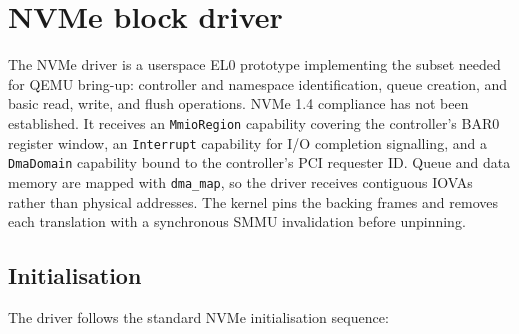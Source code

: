 \begin{center}
\end{center}

\section{NVMe block driver}

The NVMe driver is a userspace EL0 prototype implementing the subset needed for
QEMU bring-up: controller and namespace identification, queue creation, and
basic read, write, and flush operations. NVMe 1.4 compliance has not been
established. It receives an \texttt{MmioRegion} capability covering the controller's
BAR0 register window, an \texttt{Interrupt} capability for I/O
completion signalling, and a \texttt{DmaDomain} capability bound to the
controller's PCI requester ID. Queue and data memory are mapped with
\texttt{dma\_map}, so the driver receives contiguous IOVAs rather than physical
addresses. The kernel pins the backing frames and removes each translation
with a synchronous SMMU invalidation before unpinning.

\subsection{Initialisation}

The driver follows the standard NVMe initialisation sequence:

